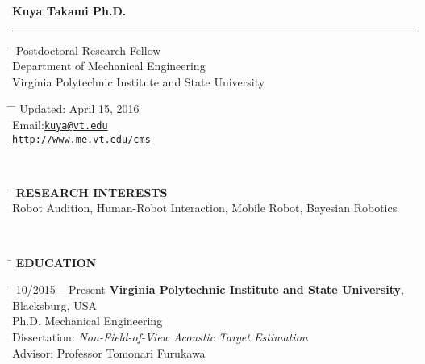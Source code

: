 \documentclass[11pt,letter]{article}
\begin{document}
{\bf \huge \noindent Kuya Takami Ph.D.}\vspace{-2mm}\\
\rule{\textwidth}{1.7pt}

\parbox{0.4\textwidth}{ %
\begin{tabbing} %
		\hspace{1cm} \= \kill %
		 \> Postdoctoral Research Fellow\\ %
		\> Department of Mechanical Engineering \\
		 \>  Virginia Polytechnic Institute and State University
\end{tabbing}}
\hfill %
\parbox{0.4\textwidth}{ %
	\begin{tabbing} %
		\hspace{1cm} \= \hspace{4cm} \= \kill %
		\> Updated: April 15, 2016 \\ %
		\> Email:\href{mailto:kuya@vt.edu}{\tt kuya@vt.edu}  \\ %
		\> \href{http://www.me.vt.edu/cms/people/kuya-takami/}{\tt http://www.me.vt.edu/cms}
	\end{tabbing}
}\\
\parbox{0.7\textwidth}{
\begin{tabbing}
	\hspace{1cm} \= \kill
	\>	{\bf \MakeUppercase{Research Interests}}\\
	\>	Robot Audition, Human-Robot Interaction, Mobile Robot, Bayesian Robotics
\end{tabbing}
}
\\
\vspace{-2mm}
\begin{tabbing}
	\hspace{1cm}\=\kill
	\>  {\bf \Large EDUCATION}
\end{tabbing} \vspace{-7mm}
\begin{tabbing}
	\hspace{3cm} \= \kill
	{\footnotesize 10/2015 -- Present} \> {\bf Virginia Polytechnic Institute and State University}, Blacksburg, USA\\
	\> Ph.D.  Mechanical Engineering \\
	\> Dissertation: {\it Non-Field-of-View Acoustic Target Estimation}\\
	\> Advisor: Professor Tomonari Furukawa
\end{tabbing}
\end{document}
